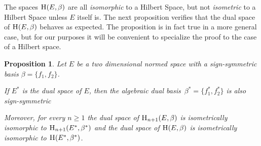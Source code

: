 \documentclass{article}[1100]
\newtheorem{proposition}[theorem]{Proposition}
\theoremstyle{definition}
\theoremstyle{remark}
\newcommand\mySpaceH[1]{\textsc{H}(#1)}
\newcommand\mySpace[2]{\textsc{H}_{#1}(#2)}
\begin{document}
The spaces $\mySpaceH{E,\beta}$ are all \emph{isomorphic} to a Hilbert Space, but not \emph{isometric} to a Hilbert Space unless $E$ itself is. The next proposition verifies that the dual space
of $\mySpaceH{E,\beta}$ behaves as expected. The proposition is in fact true in a more general case, but for our purposes it will be convenient
to specialize the proof to the case of a Hilbert space. 
\begin{tcolorbox}
\begin{proposition}\label{dualSpaceProposition}
 Let $E$ be a two dimensional normed space  with a  sign-symmetric basis $\beta=\{f_1,f_2\}$.
 
 \medskip 
 
If $E^*$ is the dual space of $E$, then the algebraic dual basis~$\beta^*=\{f_1^*,f_2^*\}$ is also sign-symmetric 

\medskip

Moreover, for every ${n\geq 1}$
the dual space of $\mySpace{n+1}{E,\beta}$ is isometrically isomorphic to $\mySpace{n+1}{E^*,\beta^*}$ and the dual space of $\mySpaceH{E,\beta}$ is isometrically isomorphic to $\mySpaceH{E^*,\beta^*}$.
\end{proposition}
\end{tcolorbox}
\end{document}
